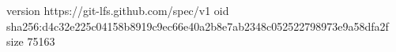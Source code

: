version https://git-lfs.github.com/spec/v1
oid sha256:d4c32e225c04158b8919c9ec66e40a2b8e7ab2348c052522798973e9a58dfa2f
size 75163
